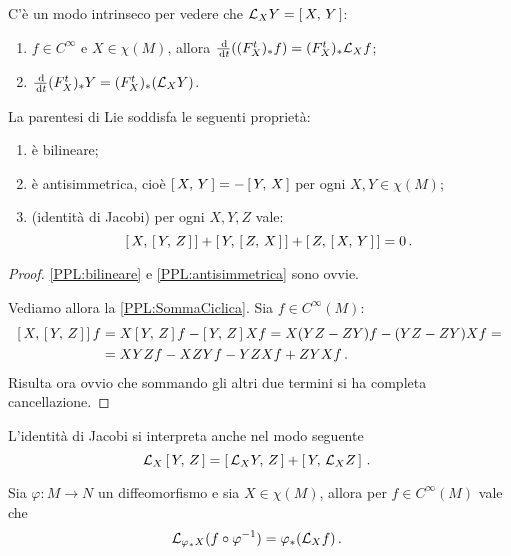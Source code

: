 \begin{remark}
	C'è un modo intrinseco per vedere che $\mathcal L_XY=\left[\,X,\,Y\,\right]$:
	\begin{enumerate}
	 \item $f\in C^\infty$ e $X\in\chi(M)$, allora $\frac {\,\mathrm d}{\,\mathrm d t} ((F_X^t)_*f)=(F_X^t)_*\mathcal L_Xf$;
	 \item $\frac{\,\mathrm d}{\,\mathrm d t} (F_X^t)_*Y=(F_X^t)_*(\mathcal L_XY)$.
	\end{enumerate}
\end{remark}

\begin{proposition}\label{prop:ProprietaParentesiLie}
	La parentesi di Lie soddisfa le seguenti proprietà:
	\begin{enumerate}
	 \item è bilineare; \label{PPL:bilineare}
	 \item è antisimmetrica, cioè $\left[\,X,\,Y\,\right]=-\left[\,Y,\,X\,\right]$ per ogni $X,Y\in\chi(M)$; \label{PPL:antisimmetrica}
	 \item (identità di Jacobi) per ogni $X,Y,Z$ vale:
	 \begin{equation*}\left[\,X,\,\left[\,Y,\,Z\,\right]\,\right]+\left[\,Y,\,\left[\,Z,\,X\,\right]\,\right]+\left[\,Z,\,\left[\,X,\,Y\,\right]\,\right]=0\, \text{. }\end{equation*} \label{PPL:SommaCiclica}
	\end{enumerate}
\end{proposition}

\begin{proof}
	\ref{PPL:bilineare} e \ref{PPL:antisimmetrica} sono ovvie.
	
	Vediamo allora la \ref{PPL:SommaCiclica}. Sia $f\in C^\infty(M)$:
	\begin{align*}
		\left[\,X,\,\left[\,Y,\,Z\,\right]\,\right]f&=X\left[\,Y,\,Z\,\right]f-\left[\,Y,\,Z\,\right]Xf=X(YZ-ZY)f-(YZ-ZY)Xf=\\
		&= XYZf-XZYf-YZXf+ZYXf\, \text{. }
	\end{align*}
	Risulta ora ovvio che sommando gli altri due termini si ha completa cancellazione.
\end{proof}

\begin{remark}
	L'identità di Jacobi si interpreta anche nel modo seguente
	\begin{equation*}
		\mathcal L_X\left[\,Y,\,Z\,\right]=\left[\,\mathcal L_XY,\,Z\,\right]+\left[\,Y,\,\mathcal L_XZ\,\right]\, \text{. }
	\end{equation*}
\end{remark}


\begin{lemma}\label{lem:PushFunzioni}
	Sia $\varphi:M\to N$ un diffeomorfismo e sia $X\in\chi(M)$, allora per $f\in C^\infty(M)$ vale che
	\begin{equation*}
		\mathcal L_{\varphi_*X}(f\circ \varphi^{-1})=\varphi_*(\mathcal L_Xf)\, \text{. }
	\end{equation*}
\end{lemma}

